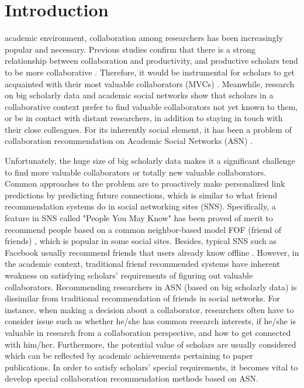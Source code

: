 \documentclass[10pt,journal,compsoc]{IEEEtran}
\begin{document}
\maketitle

\IEEEdisplaynotcompsoctitleabstractindextext
\IEEEpeerreviewmaketitle



\section{Introduction}
 academic environment, collaboration among researchers has been increasingly popular and necessary. Previous studies confirm that there is a strong relationship between collaboration and productivity, and productive scholars tend to be more collaborative \cite{Katz:what, Lee:impact}. Therefore, it would be instrumental for scholars to get acquainted with their most valuable collaborators (MVCs) \cite{Chen:CollabSeer}. Meanwhile, research on big scholarly data and academic social networks \cite{Tang:arnetminer, Tang:cross-domain} show that scholars in a collaborative context prefer to find valuable collaborators not yet known to them, or be in contact with distant researchers, in addition to staying in touch with their close colleagues. For its inherently social element, it has been a problem of collaboration recommendation on Academic Social Networks (ASN) \cite{lopes2010collaboration}.

Unfortunately, the huge size of big scholarly data makes it a significant challenge to find more valuable collaborators or totally new valuable collaborators. Common approaches to the problem are to proactively make personalized link predictions by predicting future connections, which is similar to what friend recommendation systems do in social networking sites (SNS). Specifically, a feature in SNS called "People You May Know" has been proved of merit to recommend people based on a common neighbor-based model FOF (friend of friends) \cite{Herlocker:analysis, Toscher:improved}, which is popular in some social sites. Besides, typical SNS such as Facebook usually recommend friends that users already know offline \cite{Boyd:social}. However, in the academic context, traditional friend recommended systems have inherent weakness on satisfying scholars' requirements of figuring out valuable collaborators. Recommending researchers in ASN (based on big scholarly data) is dissimilar from traditional recommendation of friends in social networks. For instance, when making a decision about a collaborator, researchers often have to consider issue such as whether he/she has common research interests, if he/she is valuable in research from a collaboration perspective, and how to get connected with him/her. Furthermore, the potential value of scholars are usually considered which can be reflected by academic achievements pertaining to paper publications. In order to satisfy scholars' special requirements, it becomes vital to develop special collaboration recommendation methods based on ASN.
\end{document}
